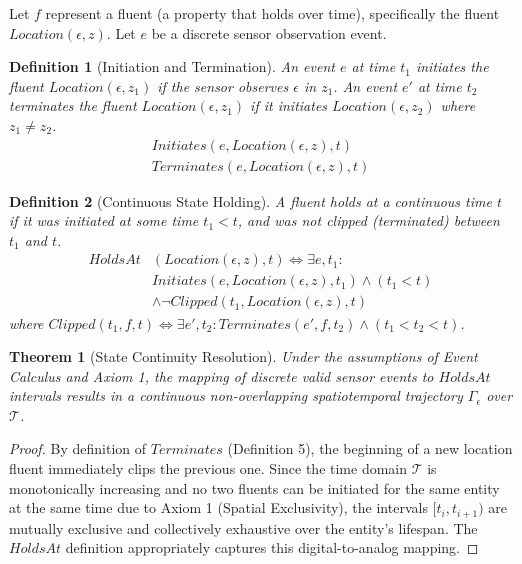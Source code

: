 \documentclass[conference]{IEEEtran}
\newtheorem{theorem}{Theorem}
\newtheorem{definition}{Definition}
\newcommand{\T}{\mathcal{T}} %
\begin{document}
Let $f$ represent a fluent (a property that holds over time), specifically the fluent $Location(\epsilon, z)$. Let $e$ be a discrete sensor observation event.

\begin{definition}[Initiation and Termination]
An event $e$ at time $t_1$ \textit{initiates} the fluent $Location(\epsilon, z_1)$ if the sensor observes $\epsilon$ in $z_1$. An event $e'$ at time $t_2$ \textit{terminates} the fluent $Location(\epsilon, z_1)$ if it initiates $Location(\epsilon, z_2)$ where $z_1 \neq z_2$.
\begin{align}
Initiates(e, Location(\epsilon, z), t) \\
Terminates(e, Location(\epsilon, z), t) 
\end{align}
\end{definition}

\begin{definition}[Continuous State Holding]
A fluent holds at a continuous time $t$ if it was initiated at some time $t_1 < t$, and was not clipped (terminated) between $t_1$ and $t$.
\begin{equation}
\begin{aligned}
HoldsAt&(Location(\epsilon, z), t) \iff \exists e, t_1 : \\
& Initiates(e, Location(\epsilon, z), t_1) \land (t_1 < t) \\
& \land \neg Clipped(t_1, Location(\epsilon, z), t)
\end{aligned}
\end{equation}
where $Clipped(t_1, f, t) \iff \exists e', t_2 : Terminates(e', f, t_2) \land (t_1 < t_2 < t)$.
\end{definition}

\begin{theorem}[State Continuity Resolution]
Under the assumptions of Event Calculus and Axiom 1, the mapping of discrete valid sensor events to $HoldsAt$ intervals results in a continuous non-overlapping spatiotemporal trajectory $\Gamma_\epsilon$ over $\T$.
\end{theorem}
\begin{proof}
By definition of $Terminates$ (Definition 5), the beginning of a new location fluent immediately clips the previous one. Since the time domain $\T$ is monotonically increasing and no two fluents can be initiated for the same entity at the same time due to Axiom 1 (Spatial Exclusivity), the intervals $[t_i, t_{i+1})$ are mutually exclusive and collectively exhaustive over the entity’s lifespan. The $HoldsAt$ definition appropriately captures this digital-to-analog mapping.
\end{proof}
\end{document}

